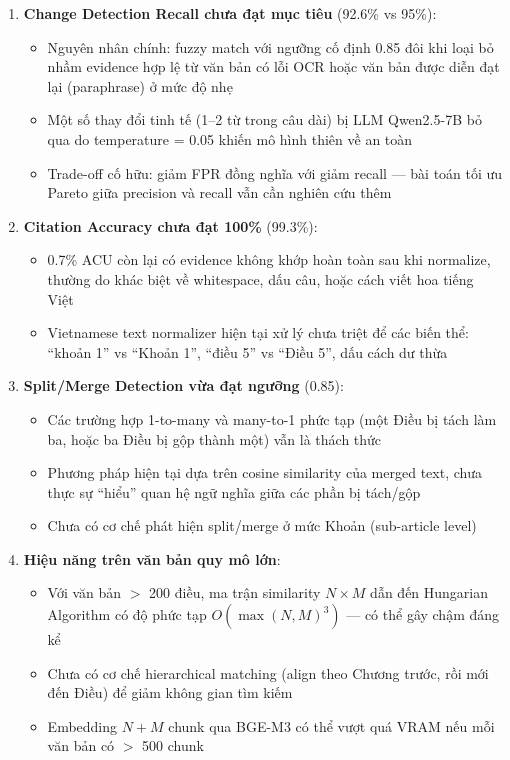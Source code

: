 \begin{enumerate}[label=(\arabic*)]

    \item \textbf{Change Detection Recall chưa đạt mục tiêu} (92.6\% vs 95\%):
    \begin{itemize}
        \item Nguyên nhân chính: fuzzy match với ngưỡng cố định 0.85 đôi khi loại bỏ nhầm evidence hợp lệ từ văn bản có lỗi OCR hoặc văn bản được diễn đạt lại (paraphrase) ở mức độ nhẹ
        \item Một số thay đổi tinh tế (1--2 từ trong câu dài) bị LLM Qwen2.5-7B bỏ qua do temperature = 0.05 khiến mô hình thiên về an toàn
        \item Trade-off cố hữu: giảm FPR đồng nghĩa với giảm recall — bài toán tối ưu Pareto giữa precision và recall vẫn cần nghiên cứu thêm
    \end{itemize}

    \item \textbf{Citation Accuracy chưa đạt 100\%} (99.3\%):
    \begin{itemize}
        \item 0.7\% ACU còn lại có evidence không khớp hoàn toàn sau khi normalize, thường do khác biệt về whitespace, dấu câu, hoặc cách viết hoa tiếng Việt
        \item Vietnamese text normalizer hiện tại xử lý chưa triệt để các biến thể: ``khoản 1'' vs ``Khoản 1'', ``điều 5'' vs ``Điều 5'', dấu cách dư thừa
    \end{itemize}

    \item \textbf{Split/Merge Detection vừa đạt ngưỡng} (0.85):
    \begin{itemize}
        \item Các trường hợp 1-to-many và many-to-1 phức tạp (một Điều bị tách làm ba, hoặc ba Điều bị gộp thành một) vẫn là thách thức
        \item Phương pháp hiện tại dựa trên cosine similarity của merged text, chưa thực sự ``hiểu'' quan hệ ngữ nghĩa giữa các phần bị tách/gộp
        \item Chưa có cơ chế phát hiện split/merge ở mức Khoản (sub-article level)
    \end{itemize}

    \item \textbf{Hiệu năng trên văn bản quy mô lớn}:
    \begin{itemize}
        \item Với văn bản $>$ 200 điều, ma trận similarity $N \times M$ dẫn đến Hungarian Algorithm có độ phức tạp $O(\max(N,M)^3)$ — có thể gây chậm đáng kể
        \item Chưa có cơ chế hierarchical matching (align theo Chương trước, rồi mới đến Điều) để giảm không gian tìm kiếm
        \item Embedding $N + M$ chunk qua BGE-M3 có thể vượt quá VRAM nếu mỗi văn bản có $>$ 500 chunk
    \end{itemize}


\end{enumerate}
